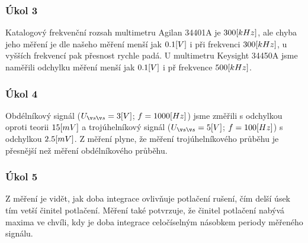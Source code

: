 \documentclass{article}
\begin{document}
\subsubsection*{Úkol 3}
Katalogový frekvenční rozsah multimetru Agilan 34401A je \(300\-[kHz]\), ale chyba jeho měření je dle našeho měření menší jak \(0.1\-[V]\) i při frekvenci \(300\-[kHz]\), u vyšších frekvencí pak přesnost rychle padá.
U multimetru Keysight 34450A jsme naměřili odchylku měření menší jak \(0.1\-[V]\) i př frekvence \(500\-[kHz]\).

\subsubsection*{Úkol 4}
Obdélníkový signál (\(U_{šš} = 3\-[V]\); \(f = 1000\-[Hz]\)) jsme změřili s odchylkou oproti teorii \(15\-[mV]\) a trojúhelníkový signál (\(U_{šš} = 5\-[V]\); \(f = 100\-[Hz]\)) s odchylkou \(2.5\-[mV]\).
Z měření plyne, že měření trojúhelníkového průběhu je přesnější než měření obdélníkového průběhu.

\subsubsection*{Úkol 5}
Z měření je vidět, jak doba integrace ovlivňuje potlačení rušení, čím delší úsek tím vetší činitel potlačení.
Měření také potvrzuje, že činitel potlačení nabývá maxima ve chvíli, kdy je doba integrace celočíselným násobkem periody měřeného signálu.
\end{document}
